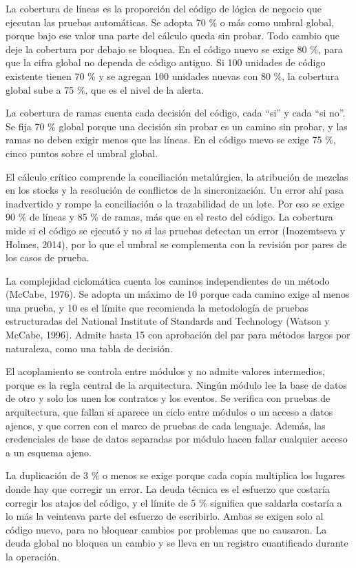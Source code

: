 \documentclass[anexo]{../../comun/overfore}
\begin{document}
La cobertura de líneas es la proporción del código de lógica de negocio que ejecutan las pruebas automáticas. Se adopta 70 \% o más como umbral global, porque bajo ese valor una parte del cálculo queda sin probar. Todo cambio que deje la cobertura por debajo se bloquea. En el código nuevo se exige 80 \%, para que la cifra global no dependa de código antiguo. Si 100 unidades de código existente tienen 70 \% y se agregan 100 unidades nuevas con 80 \%, la cobertura global sube a 75 \%, que es el nivel de la alerta.

La cobertura de ramas cuenta cada decisión del código, cada “si” y cada “si no”. Se fija 70 \% global porque una decisión sin probar es un camino sin probar, y las ramas no deben exigir menos que las líneas. En el código nuevo se exige 75 \%, cinco puntos sobre el umbral global.

El cálculo crítico comprende la conciliación metalúrgica, la atribución de mezclas en los stocks y la resolución de conflictos de la sincronización. Un error ahí pasa inadvertido y rompe la conciliación o la trazabilidad de un lote. Por eso se exige 90 \% de líneas y 85 \% de ramas, más que en el resto del código. La cobertura mide si el código se ejecutó y no si las pruebas detectan un error (Inozemtseva y Holmes, 2014), por lo que el umbral se complementa con la revisión por pares de los casos de prueba.

La complejidad ciclomática cuenta los caminos independientes de un método (McCabe, 1976). Se adopta un máximo de 10 porque cada camino exige al menos una prueba, y 10 es el límite que recomienda la metodología de pruebas estructuradas del National Institute of Standards and Technology (Watson y McCabe, 1996). Admite hasta 15 con aprobación del par para métodos largos por naturaleza, como una tabla de decisión.

El acoplamiento se controla entre módulos y no admite valores intermedios, porque es la regla central de la arquitectura. Ningún módulo lee la base de datos de otro y solo los unen los contratos y los eventos. Se verifica con pruebas de arquitectura, que fallan si aparece un ciclo entre módulos o un acceso a datos ajenos, y que corren con el marco de pruebas de cada lenguaje. Además, las credenciales de base de datos separadas por módulo hacen fallar cualquier acceso a un esquema ajeno.

La duplicación de 3 \% o menos se exige porque cada copia multiplica los lugares donde hay que corregir un error. La deuda técnica es el esfuerzo que costaría corregir los atajos del código, y el límite de 5 \% significa que saldarla costaría a lo más la veinteava parte del esfuerzo de escribirlo. Ambas se exigen solo al código nuevo, para no bloquear cambios por problemas que no causaron. La deuda global no bloquea un cambio y se lleva en un registro cuantificado durante la operación.
\end{document}
